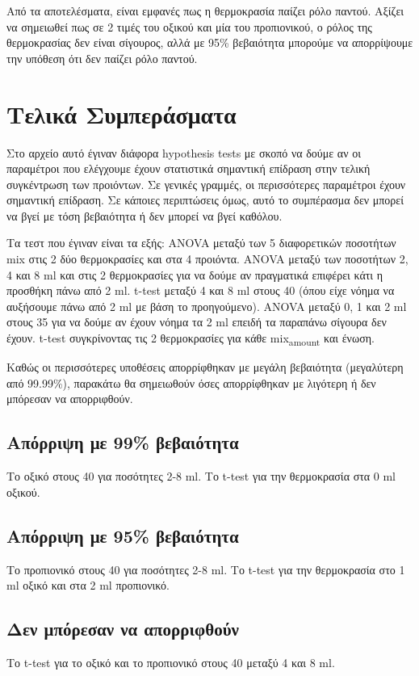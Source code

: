 \documentclass[11pt]{article}
\begin{document}
Από τα αποτελέσματα, είναι εμφανές πως η θερμοκρασία παίζει ρόλο παντού. Αξίζει να σημειωθεί πως σε 2 τιμές του οξικού και μία του προπιονικού, ο ρόλος της θερμοκρασίας δεν είναι σίγουρος, αλλά με 95\% βεβαιότητα μπορούμε να απορρίψουμε την υπόθεση ότι δεν παίζει ρόλο παντού.

\section{Τελικά Συμπεράσματα}
\label{sec:org34c21da}
Στο αρχείο αυτό έγιναν διάφορα hypothesis tests με σκοπό να δούμε αν οι παραμέτροι που ελέγχουμε έχουν στατιστικά σημαντική επίδραση στην τελική συγκέντρωση των προιόντων. Σε γενικές γραμμές, οι περισσότερες παραμέτροι έχουν σημαντική επίδραση. Σε κάποιες περιπτώσεις όμως, αυτό το συμπέρασμα δεν μπορεί να βγεί με τόση βεβαιότητα ή δεν μπορεί να βγεί καθόλου.

Τα τεστ που έγιναν είναι τα εξής: ANOVA μεταξύ των 5 διαφορετικών ποσοτήτων mix στις 2 δύο θερμοκρασίες και στα 4 προιόντα. ANOVA μεταξύ των ποσοτήτων 2, 4 και 8 ml και στις 2 θερμοκρασίες για να δούμε αν πραγματικά επιφέρει κάτι η προσθήκη πάνω από 2 ml. t-test μεταξύ 4 και 8 ml στους 40 (όπου είχε νόημα να αυξήσουμε πάνω από 2 ml με βάση το προηγούμενο). ANOVA μεταξύ 0, 1 και 2 ml στους 35 για να δούμε αν έχουν νόημα τα 2 ml επειδή τα παραπάνω σίγουρα δεν έχουν. t-test συγκρίνοντας τις 2 θερμοκρασίες για κάθε mix\textsubscript{amount} και ένωση.

Καθώς οι περισσότερες υποθέσεις απορρίφθηκαν με μεγάλη βεβαιότητα (μεγαλύτερη από 99.99\%), παρακάτω θα σημειωθούν όσες απορρίφθηκαν με λιγότερη ή δεν μπόρεσαν να απορριφθούν.

\subsection{Απόρριψη με 99\% βεβαιότητα}
\label{sec:org8f47f90}
Το οξικό στους 40 για ποσότητες 2-8 ml.
Το t-test για την θερμοκρασία στα 0 ml οξικού.

\subsection{Απόρριψη με 95\% βεβαιότητα}
\label{sec:orgc6e53b8}
Το προπιονικό στους 40 για ποσότητες 2-8 ml.
Το t-test για την θερμοκρασία στο 1 ml οξικό και στα 2 ml προπιονικό.

\subsection{Δεν μπόρεσαν να απορριφθούν}
\label{sec:orgd6cff9f}
Το t-test για το οξικό και το προπιονικό στους 40 μεταξύ 4 και 8 ml.
\end{document}
